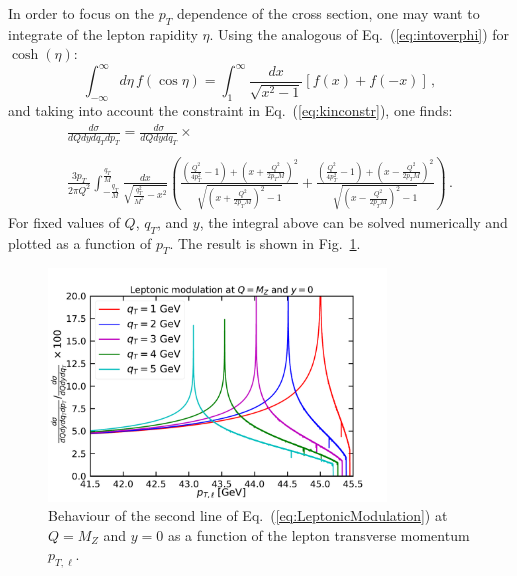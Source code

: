 \documentclass[10pt,a4paper]{article}
\begin{document}
In order to focus on the $p_T$ dependence of the cross section, one
may want to integrate of the lepton rapidity $\eta$. Using the
analogous of Eq.~(\ref{eq:intoverphi}) for $\cosh(\eta)$:
\begin{equation}\label{eq:intovereta}
\int_{-\infty}^{\infty}d\eta\, f(\cos\eta) = \int_{1}^{\infty}\frac{dx}{\sqrt{x^2-1}}\left[f(x)+f(-x)\right]\,,
\end{equation}
and taking into account the constraint in Eq.~(\ref{eq:kinconstr}),
one finds:
\begin{equation}\label{eq:LeptonicModulation}
\begin{array}{l}
\displaystyle \frac{d\sigma}{dQ dy dq_T dp_T} =\frac{d\sigma}{dQ dy
  dq_T} \times\\
\\
\displaystyle\frac
                                                          {3p_T}{2\pi
                                                          Q^2}\int_{-\frac{q_T}{M}}^{\frac{q_T}{M}}
  \frac{dx}{\sqrt{\frac{q_T^2}{M^2}-x^2}}\left(\frac{\left(\frac{Q^2}{4
  p_T^2}-1\right)+\left(x+\frac{Q^2}{2p_TM}\right)^2}{\sqrt{\left(x+\frac{Q^2}{2p_TM}\right)^2-1}}+\frac{\left(\frac{Q^2}{4
  p_T^2}-1\right)+\left(x-\frac{Q^2}{2p_TM}\right)^2}{\sqrt{\left(x-\frac{Q^2}{2p_TM}\right)^2-1}}\right)\,.
\end{array}
\end{equation}
For fixed values of $Q$, $q_T$, and $y$, the integral above can be
solved numerically and plotted as a function of $p_T$. The result is
shown in Fig.~\ref{fig:LeptonicModulation}.
\begin{figure}[t]
  \begin{centering}
    \includegraphics[width=0.8\textwidth]{plots/LeptonicModulation.pdf}
    \caption{Behaviour of the second line of
      Eq.~(\ref{eq:LeptonicModulation}) at $Q=M_Z$ and $y=0$ as a
      function of the lepton transverse momentum
      $p_{T,\ell}$.\label{fig:LeptonicModulation}}
  \end{centering}
\end{figure}
\end{document}
